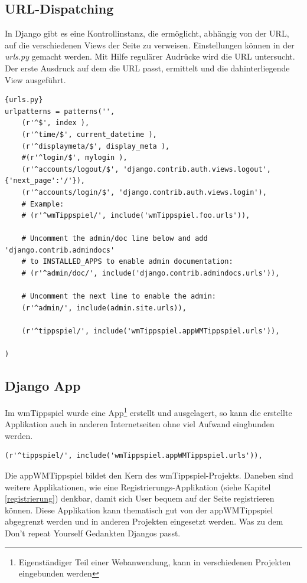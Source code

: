 \documentclass[titlepage, 12pt,a4paper]{scrartcl}
\begin{document}
\subsection{URL-Dispatching}
In Django gibt es eine Kontrollinstanz, die ermöglicht, abhängig von der URL,
auf die verschiedenen Views der Seite zu verweisen. Einstellungen können in der
\emph{urls.py} gemacht werden. Mit Hilfe regulärer Audrücke wird die URL
untersucht. Der erste Ausdruck auf dem die URL passt, ermittelt und
die dahinterliegende View ausgeführt.

\begin{lstlisting}[caption=Auszug ursl.py]{urls.py}
urlpatterns = patterns('',
    (r'^$', index ),
    (r'^time/$', current_datetime ),
    (r'^displaymeta/$', display_meta ),
    #(r'^login/$', mylogin ),
    (r'^accounts/logout/$', 'django.contrib.auth.views.logout', {'next_page':'/'}),
    (r'^accounts/login/$', 'django.contrib.auth.views.login'),
    # Example:
    # (r'^wmTippspiel/', include('wmTippspiel.foo.urls')),

    # Uncomment the admin/doc line below and add 'django.contrib.admindocs'
    # to INSTALLED_APPS to enable admin documentation:
    # (r'^admin/doc/', include('django.contrib.admindocs.urls')),

    # Uncomment the next line to enable the admin:
    (r'^admin/', include(admin.site.urls)),
    
    (r'^tippspiel/', include('wmTippspiel.appWMTippspiel.urls')),
    
)
\end{lstlisting}

\subsection{Django App}
Im wmTippspiel wurde eine App\footnote{Eigenständiger Teil einer Webanwendung,
kann in verschiedenen Projekten eingebunden werden} erstellt und ausgelagert, so
kann die erstellte Applikation auch in anderen Internetseiten ohne viel Aufwand 
eingbunden werden.

\begin{lstlisting}
(r'^tippspiel/', include('wmTippspiel.appWMTippspiel.urls')),
\end{lstlisting}

Die appWMTippspiel bildet den Kern des wmTippspiel-Projekts. Daneben sind
weitere Applikationen, wie eine Registrierungs-Applikation
(siehe Kapitel \ref{registrierung}) denkbar, damit sich User bequem auf der
Seite registrieren können. Diese Applikation kann thematisch gut von der 
appWMTippspiel abgegrenzt werden und in anderen Projekten eingesetzt werden. 
Was zu dem Don't repeat Yourself Gedankten Djangos passt.
\end{document}
